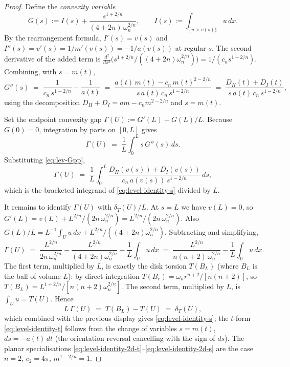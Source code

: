 \documentclass[11pt]{amsart}
\newcommand{\dT}{\delta_T}
\begin{document}
\begin{proof}
Define the \emph{convexity variable}
\begin{equation}\label{eq:lev-Gdef}
   G(s):=I(s)+\frac{s^{1+2/n}}{(4+2n)\,\omega_n^{2/n}},
   \qquad
   I(s):=\int_{\{u>v(s)\}}u\,dx.
\end{equation}
By the rearrangement formula, \(I'(s)=v(s)\) and
\(I''(s)=v'(s)=1/m'(v(s))=-1/a(v(s))\) at regular \(s\).  The second
derivative of the added term is
\(\frac{d^{2}}{ds^{2}}\!\bigl(s^{1+2/n}/((4+2n)\omega_n^{2/n})\bigr)
=1/(c_n s^{1-2/n})\).  Combining, with \(s=m(t)\),
\begin{equation}\label{eq:lev-Gpp}
   G''(s)\;=\;\frac{1}{c_n\,s^{1-2/n}}-\frac{1}{a(t)}
        \;=\;\frac{a(t)\,m(t)-c_n\,m(t)^{2-2/n}}{s\,a(t)\,c_n\,s^{1-2/n}}
        \;=\;\frac{D_H(t)+D_I(t)}{s\,a(t)\,c_n\,s^{1-2/n}},
\end{equation}
using the decomposition \(D_H+D_I=a m-c_n m^{2-2/n}\) and \(s=m(t)\).

Set the endpoint convexity gap
\(\Gamma(U):=G'(L)-G(L)/L\).  Because \(G(0)=0\), integration by parts
on \([0,L]\) gives
\begin{equation}\label{eq:lev-IBP}
   \Gamma(U)\;=\;\frac{1}{L}\int_0^L\!s\,G''(s)\,ds.
\end{equation}
Substituting \eqref{eq:lev-Gpp},
\[
   \Gamma(U)\;=\;\frac{1}{L}\int_0^{L}\!
   \frac{D_H(v(s))+D_I(v(s))}{c_n\,a(v(s))\,s^{1-2/n}}\,ds,
\]
which is the bracketed integrand of \eqref{eq:level-identity-s}
divided by \(L\).

It remains to identify \(\Gamma(U)\) with \(\dT(U)/L\).  At \(s=L\)
we have \(v(L)=0\), so
\(G'(L)=v(L)+L^{2/n}/(2n\,\omega_n^{2/n})=L^{2/n}/(2n\,\omega_n^{2/n})\).
Also
\(G(L)/L=L^{-1}\int_U\!u\,dx+L^{2/n}/((4+2n)\omega_n^{2/n})\).
Subtracting and simplifying,
\[
   \Gamma(U)
   \;=\;\frac{L^{2/n}}{2n\,\omega_n^{2/n}}-\frac{L^{2/n}}{(4+2n)\omega_n^{2/n}}
        -\frac{1}{L}\int_U\!u\,dx
   \;=\;\frac{L^{2/n}}{n(n+2)\,\omega_n^{2/n}}-\frac{1}{L}\int_U\!u\,dx.
\]
The first term, multiplied by \(L\), is exactly the disk torsion
\(T(B_L)\) (where \(B_L\) is the ball of volume \(L\)): by direct
integration \(T(B_r)=\omega_n r^{n+2}/[n(n+2)]\), so
\(T(B_L)=L^{1+2/n}/[n(n+2)\omega_n^{2/n}]\).  The second term,
multiplied by \(L\), is \(\int_U u=T(U)\).  Hence
\[
   L\,\Gamma(U)\;=\;T(B_L)-T(U)\;=\;\dT(U),
\]
which combined with the previous display gives
\eqref{eq:level-identity-s}; the \(t\)-form
\eqref{eq:level-identity-t} follows from the change of variables
\(s=m(t)\), \(ds=-a(t)\,dt\) (the orientation reversal cancelling
with the sign of \(ds\)).  The planar specialisations
\eqref{eq:level-identity-2d-t}--\eqref{eq:level-identity-2d-s} are
the case \(n=2\), \(c_2=4\pi\), \(m^{1-2/n}=1\).
\end{proof}
\end{document}
